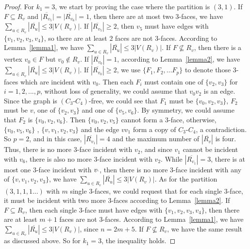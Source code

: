 \documentclass[12pt]{article}
\begin{document}
\begin{proof}
    For $k_1=3$, we start by proving the case where the partition is $(3,1)$. If $F\subseteq R_v$ and $\overline{|R_{v_5}}|=|\overline{R_{v_6}}|=1$, then there are at most two $3$-faces, we have $\sum_{u \in R_v}|\overline{R_u}| \leq 3|V(R_v)|$. If $|\overline{R_{v_5}}| \geq 2$, then $v_5$ must have edges with $\{v_1,v_2,v_3,v_4\}$, so there are at least $2$ faces are not $3$-faces. According to Lemma~\ref{lemma1}, we have $\sum_{u \in R_v}|\overline{R_u}| \leq 3|V(R_v)|$. If $F\not\subseteq R_v$, then there is a vertex $v_0\in F$ but $v_0 \not\in R_v$. If $|\overline{R_{v_0}}|=1$, according to Lemma~\ref{lemma2}, we have $\sum_{u \in R_v}|\overline{R_u}| \leq 3|V(R_v)|$. If $|\overline{R_{v_0}}|\geq2$, we use $\{F_1,F_2,...F_p\}$ to denote those $3$-faces which are incident with $v_0$. Then each $F_i$ must contain one of $\{v_2,v_3\}$ for $i=1,2,...,p$, without loss of generality, we could assume that $v_0v_2$ is an edge. Since the graph is $(C_3\text{-}C_4)$-free, we could see that $F_1$ must be $\{v_0,v_2,v_3\}$, $F_2$ must be $v$, one of $\{v_2,v_3\}$ and one of $\{v_5,v_6\}$. By symmetry, we could assume that $F_2$ is $\{v_0,v_2,v_6\}$. Then $\{v_0,v_2,v_5\}$ cannot form a $3$-face, otherwise, $\{v_0,v_5,v_6\}$ , $\{v,v_1,v_2,v_3\}$ and the edge $vv_1$ form a copy of $C_3\text{-}C_4$, a contradiction. So $p=2$, and in this case, $|\overline{R_{v_1}}|=4$ and the maximum number of $|\overline{R_v}|$ is four. Thus, there is no more $3$-face incident with $v_2$, and since $v_1$ cannot be incident with $v_6$, there is also no more $3$-face incident with $v_2$. While $|\overline{R_{v_1}}|=3$, there is at most one $3$-face incident with $v_`$, then there is no more $3$-face incident with any of $\{v,v_1,v_2,v_3\}$, we have $\sum_{u \in R_v}|\overline{R_u}| \leq 3|V(R_v)|$. As for the partition $(3,1,1,1...)$ with $m$ single $3$-faces, we could request that for each single $3$-face, it must be incident with two more $3$-faces according to Lemma~\ref{lemma2}. If $F \subseteq R_v$, then each single $3$-face must have edges with $\{v_1,v_2,v_3,v_4\}$, then there are at least $m+1$ faces are not $3$-faces. According to Lemma~\ref{lemma1}, we have $\sum_{u \in R_v}|\overline{R_u}| \leq 3|V(R_v)|$, since $n=2m+5$. If $F \not\subseteq R_v$, we have the same result as discussed above. So for $k_1=3$, the inequality holds.
    

\end{proof}
\end{document}

